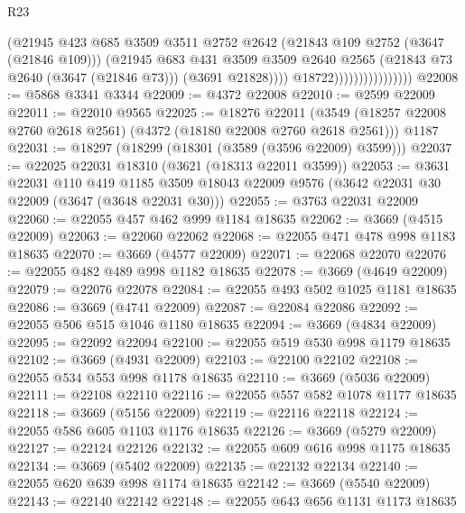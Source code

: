 \begin{lexlean}{R23}
\begin{coremodule}
                                      (@21945
                                        @423
                                        @685
                                        @3509
                                        @3511
                                        @2752
                                        @2642
                                        (@21843 @109 @2752 (@3647 (@21846 @109)))
                                        (@21945
                                          @683
                                          @431
                                          @3509
                                          @3509
                                          @2640
                                          @2565
                                          (@21843 @73 @2640 (@3647 (@21846 @73)))
                                          (@3691 @21828))))
                                    @18722))))))))))))))))
@22008 := @5868 @3341 @3344
@22009 := @4372 @22008
@22010 := @2599 @22009
@22011 := @22010 @9565
@22025 := @18276
    @22011
    (@3549 (@18257 @22008 @2760 @2618 @2561) (@4372 (@18180 @22008 @2760 @2618 @2561)))
    @1187
@22031 := @18297 (@18299 (@18301 (@3589 (@3596 @22009) @3599)))
@22037 := @22025 @22031 @18310 (@3621 (@18313 @22011 @3599))
@22053 := @3631
    @22031
    @110
    @419
    @1185
    @3509
    @18043
    @22009
    @9576
    (@3642 @22031 @30 @22009 (@3647 (@3648 @22031 @30)))
@22055 := @3763 @22031 @22009
@22060 := @22055 @457 @462 @999 @1184 @18635
@22062 := @3669 (@4515 @22009)
@22063 := @22060 @22062
@22068 := @22055 @471 @478 @998 @1183 @18635
@22070 := @3669 (@4577 @22009)
@22071 := @22068 @22070
@22076 := @22055 @482 @489 @998 @1182 @18635
@22078 := @3669 (@4649 @22009)
@22079 := @22076 @22078
@22084 := @22055 @493 @502 @1025 @1181 @18635
@22086 := @3669 (@4741 @22009)
@22087 := @22084 @22086
@22092 := @22055 @506 @515 @1046 @1180 @18635
@22094 := @3669 (@4834 @22009)
@22095 := @22092 @22094
@22100 := @22055 @519 @530 @998 @1179 @18635
@22102 := @3669 (@4931 @22009)
@22103 := @22100 @22102
@22108 := @22055 @534 @553 @998 @1178 @18635
@22110 := @3669 (@5036 @22009)
@22111 := @22108 @22110
@22116 := @22055 @557 @582 @1078 @1177 @18635
@22118 := @3669 (@5156 @22009)
@22119 := @22116 @22118
@22124 := @22055 @586 @605 @1103 @1176 @18635
@22126 := @3669 (@5279 @22009)
@22127 := @22124 @22126
@22132 := @22055 @609 @616 @998 @1175 @18635
@22134 := @3669 (@5402 @22009)
@22135 := @22132 @22134
@22140 := @22055 @620 @639 @998 @1174 @18635
@22142 := @3669 (@5540 @22009)
@22143 := @22140 @22142
@22148 := @22055 @643 @656 @1131 @1173 @18635

\end{coremodule}
\end{lexlean}

